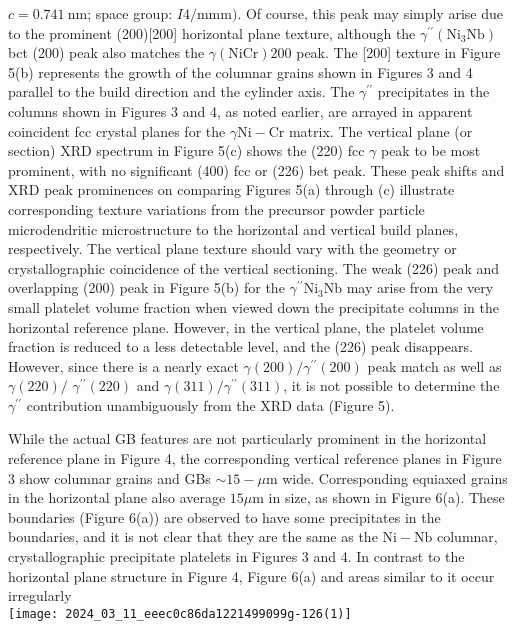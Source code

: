 \documentclass[10pt]{article}
\begin{document}
$c=0.741 \mathrm{~nm}$; space group: $I 4 / \mathrm{mmm})$. Of course, this peak may simply arise due to the prominent (200)[200] horizontal plane texture, although the $\gamma^{\prime \prime}\left(\mathrm{Ni}_{3} \mathrm{Nb}\right)$ bct (200) peak also matches the $\gamma(\mathrm{NiCr}) 200$ peak. The [200] texture in Figure 5(b) represents the growth of the columnar grains shown in Figures 3 and 4 parallel to the build direction and the cylinder axis. The $\gamma^{\prime \prime}$ precipitates in the columns shown in Figures 3 and 4, as noted earlier, are arrayed in apparent coincident fcc crystal planes for the $\gamma \mathrm{Ni}-\mathrm{Cr}$ matrix. The vertical plane (or section) XRD spectrum in Figure 5(c) shows the (220) fcc $\gamma$ peak to be most prominent, with no significant (400) fcc or (226) bet peak. These peak shifts and XRD peak prominences on comparing Figures 5(a) through (c) illustrate corresponding texture variations from the precursor powder particle microdendritic microstructure to the horizontal and vertical build planes, respectively. The vertical plane texture should vary with the geometry or crystallographic coincidence of the vertical sectioning. The weak (226) peak and overlapping (200) peak in Figure 5(b) for the $\gamma^{\prime \prime} \mathrm{Ni}_{3} \mathrm{Nb}$ may arise from the very small platelet volume fraction when viewed down the precipitate columns in the horizontal reference plane. However, in the vertical plane, the platelet volume fraction is reduced to a less detectable level, and the (226) peak disappears. However, since there is a nearly exact $\gamma(200) / \gamma^{\prime \prime}(200)$ peak match as well as $\gamma(220) /$ $\gamma^{\prime \prime}(220)$ and $\gamma(311) / \gamma^{\prime \prime}(311)$, it is not possible to determine the $\gamma^{\prime \prime}$ contribution unambiguously from the XRD data (Figure 5).

While the actual GB features are not particularly prominent in the horizontal reference plane in Figure 4, the corresponding vertical reference planes in Figure 3 show columnar grains and GBs $\sim 15-\mu \mathrm{m}$ wide. Corresponding equiaxed grains in the horizontal plane also average $15 \mu \mathrm{m}$ in size, as shown in Figure 6(a). These boundaries (Figure 6(a)) are observed to have some precipitates in the boundaries, and it is not clear that they are the same as the $\mathrm{Ni}-\mathrm{Nb}$ columnar, crystallographic precipitate platelets in Figures 3 and 4. In contrast to the horizontal plane structure in Figure 4, Figure 6(a) and areas similar to it occur irregularly\\
\texttt{[image: 2024\_03\_11\_eeec0c86da1221499099g-126(1)]}
\end{document}
